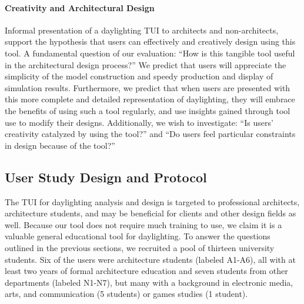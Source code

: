 \paragraph{Creativity and Architectural Design }

Informal presentation of a daylighting TUI to architects and
non-architects, support the hypothesis that users can effectively and
creatively design using this tool.  A fundamental question of our
evaluation: ``How is this tangible tool useful in the architectural
design process?''  We predict that users will appreciate the
simplicity of the model construction and speedy production and display
of simulation results.  Furthermore, we predict that when users are
presented with this more complete and detailed representation of
daylighting, they will embrace the benefits of using such a tool
regularly, and use insights gained through tool use to modify their
designs.  %
Additionally, we wish to investigate: ``Is users' creativity catalyzed
by using the tool?'' and ``Do users feel particular constraints in design
because of the tool?''  


\subsection{User Study Design and Protocol}


The TUI for daylighting analysis and design is targeted to
professional architects, architecture students, and may be beneficial
for clients and other design fields as well.  Because our tool does
not require much training to use, we claim it is a valuable general
educational tool for daylighting.  To answer the questions outlined in
the previous sections, we recruited a pool of thirteen university
students.  Six of the users were architecture students (labeled
A1-A6), all with at least two years of formal architecture education
and seven students from other departments (labeled N1-N7), but many
with a background in electronic media, arts, and communication (5
students) or games studies (1 student).

